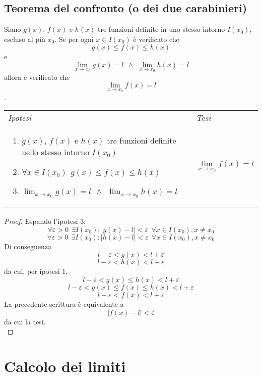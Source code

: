 \documentclass{book}     %
\begin{document}
    \subsection{Teorema del confronto (o dei due carabinieri)}
        \begin{shadedTheorem}[Confronto]
            Siano $g(x)$, $f(x)$ e $h(x)$ tre funzioni definite in uno stesso intorno $I(x_0)$, escluso al più $x_0$. Se per ogni $x\in I(x_0)$ è verificato che \[g(x)\leq f(x) \leq h(x)\]
            e \[\lim_{x\rightarrow x_0} g(x)=l ~~ \land ~~ \lim_{x\rightarrow x_0} h(x)=l\]
            allora è verificato che
            \[\lim_{x\rightarrow x_0} f(x)=l\].
        \end{shadedTheorem}
        \begin{tabular}{m{}m{}}
            \textit{Ipotesi} & \textit{Tesi}  \\
            \begin{enumerate}
                \item $g(x)$, $f(x)$ e $h(x)$ tre funzioni definite nello stesso intorno $I(x_0)$
                \item $\forall x \in I(x_0) ~~ g(x)\leq f(x) \leq h(x)$
                \item $\displaystyle\lim_{x\rightarrow x_0} g(x)=l ~~ \land ~~ \lim_{x\rightarrow x_0} h(x)=l$
            \end{enumerate} & \[\lim_{x\rightarrow x_0} f(x)=l\]\\
        \end{tabular}
        
        \begin{proof}
            Espando l'ipotesi 3:
            \[\forall \varepsilon > 0 ~~\exists I(x_0) : |g(x)-l|<\varepsilon~~\forall x \in I(x_0), x\neq x_0\]
            \[\forall \varepsilon > 0 ~~\exists I(x_0) : |h(x)-l|<\varepsilon~~\forall x \in I(x_0), x\neq x_0\]
            Di conseguenza 
            \[l-\varepsilon < g(x) <l+\varepsilon\]
            \[l-\varepsilon < h(x) <l+\varepsilon\]
            da cui, per ipotesi 1, 
            \[l-\varepsilon < g(x)\leq h(x) <l+\varepsilon\]
            \[l-\varepsilon < g(x) \leq f(x) \leq h(x) <l+\varepsilon\]
            \[l-\varepsilon < f(x) <l+\varepsilon\]
            La precedente scrittura è equivalente a 
            \[|f(x)-l|<\varepsilon\]
            da cui la tesi.\\
        \end{proof}
\section{Calcolo dei limiti}
\end{document}
